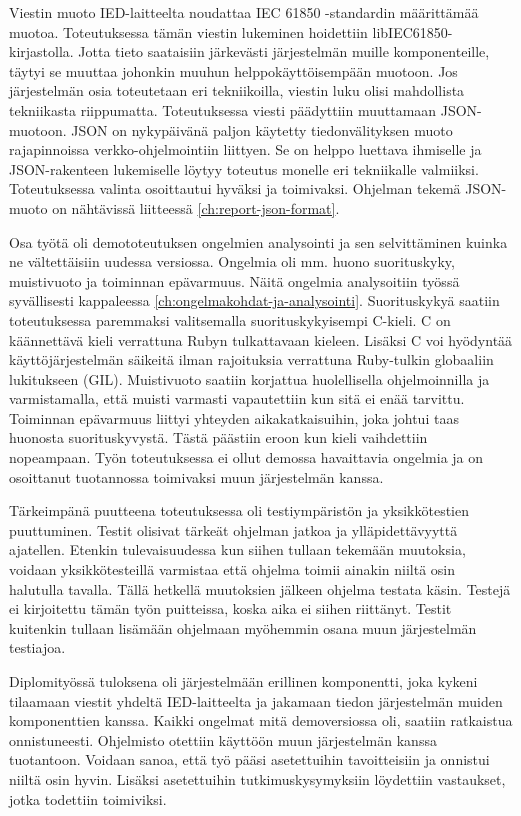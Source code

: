 Viestin muoto IED-laitteelta noudattaa IEC 61850 -standardin määrittämää muotoa. Toteutuksessa tämän viestin lukeminen hoidettiin libIEC61850-kirjastolla. Jotta tieto saataisiin järkevästi järjestelmän muille komponenteille, täytyi se muuttaa johonkin muuhun helppokäyttöisempään muotoon. Jos järjestelmän osia toteutetaan eri tekniikoilla, viestin luku olisi mahdollista tekniikasta riippumatta. Toteutuksessa viesti päädyttiin muuttamaan JSON-muotoon. JSON on nykypäivänä paljon käytetty tiedonvälityksen muoto rajapinnoissa verkko-ohjelmointiin liittyen. Se on helppo luettava ihmiselle ja JSON-rakenteen lukemiselle löytyy toteutus monelle eri tekniikalle valmiiksi. Toteutuksessa valinta osoittautui hyväksi ja toimivaksi. Ohjelman tekemä JSON-muoto on nähtävissä liitteessä \ref{ch:report-json-format}.

Osa työtä oli demototeutuksen ongelmien analysointi ja sen selvittäminen kuinka ne vältettäisiin uudessa versiossa. Ongelmia oli mm. huono suorituskyky, muistivuoto ja toiminnan epävarmuus. Näitä ongelmia analysoitiin työssä syvällisesti kappaleessa \ref{ch:ongelmakohdat-ja-analysointi}. Suorituskykyä saatiin toteutuksessa paremmaksi valitsemalla suorituskykyisempi C-kieli. C on käännettävä kieli verrattuna Rubyn tulkattavaan kieleen. Lisäksi C voi hyödyntää käyttöjärjestelmän säikeitä ilman rajoituksia verrattuna Ruby-tulkin globaaliin lukitukseen (GIL). Muistivuoto saatiin korjattua huolellisella ohjelmoinnilla ja varmistamalla, että muisti varmasti vapautettiin kun sitä ei enää tarvittu. Toiminnan epävarmuus liittyi yhteyden aikakatkaisuihin, joka johtui taas huonosta suorituskyvystä. Tästä päästiin eroon kun kieli vaihdettiin nopeampaan. Työn toteutuksessa ei ollut demossa havaittavia ongelmia ja on osoittanut tuotannossa toimivaksi muun järjestelmän kanssa.

Tärkeimpänä puutteena toteutuksessa oli testiympäristön ja yksikkötestien puuttuminen. Testit olisivat tärkeät ohjelman jatkoa ja ylläpidettävyyttä ajatellen. Etenkin tulevaisuudessa kun siihen tullaan tekemään muutoksia, voidaan yksikkötesteillä varmistaa että ohjelma toimii ainakin niiltä osin halutulla tavalla. Tällä hetkellä muutoksien jälkeen ohjelma testata käsin. Testejä ei kirjoitettu tämän työn puitteissa, koska aika ei siihen riittänyt. Testit kuitenkin tullaan lisämään ohjelmaan myöhemmin osana muun järjestelmän testiajoa.

Diplomityössä tuloksena oli järjestelmään erillinen komponentti, joka kykeni tilaamaan viestit yhdeltä IED-laitteelta ja jakamaan tiedon järjestelmän muiden komponenttien kanssa. Kaikki ongelmat mitä demoversiossa oli, saatiin ratkaistua onnistuneesti. Ohjelmisto otettiin käyttöön muun järjestelmän kanssa tuotantoon. Voidaan sanoa, että työ pääsi asetettuihin tavoitteisiin ja onnistui niiltä osin hyvin. Lisäksi asetettuihin tutkimuskysymyksiin löydettiin vastaukset, jotka todettiin toimiviksi.